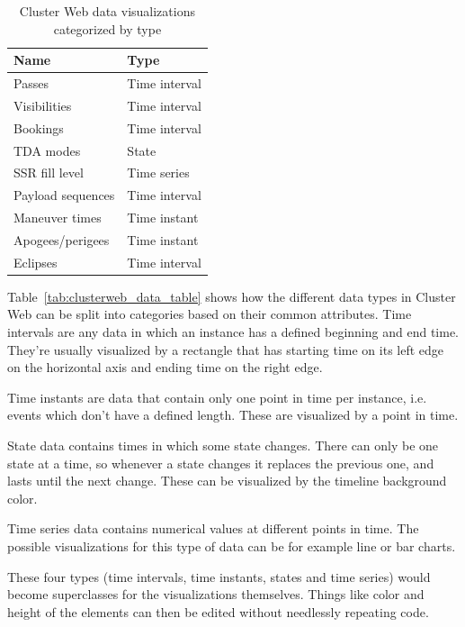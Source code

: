 \begin{table}[!ht]
\def\arraystretch{1.1}%
\begin{center}
  \caption{Cluster Web data visualizations categorized by type}
  \label{tab:clusterweb_data_types_table}
  \begin{tabular}{| l | l | }
    \hline
    Name & Type \\
    \hline
    Passes & Time interval \\
    Visibilities & Time interval \\
    Bookings & Time interval  \\
    TDA modes & State \\
    SSR fill level & Time series \\
    Payload sequences & Time interval \\
    Maneuver times & Time instant \\
    Apogees/perigees & Time instant \\
    Eclipses & Time interval \\
    \hline
  \end{tabular}

  \end{center}
\end{table}

Table~\ref{tab:clusterweb_data_table} shows how the different data types in Cluster Web can be split into categories based on their common attributes. Time intervals are any data in which an instance has a defined beginning and end time. They're usually visualized by a rectangle that has starting time on its left edge on the horizontal axis and ending time on the right edge.

Time instants are data that contain only one point in time per instance, i.e. events which don't have a defined length. These are visualized by a point in time.

State data contains times in which some state changes. There can only be one state at a time, so whenever a state changes it replaces the previous one, and lasts until the next change. These can be visualized by the timeline background color.

Time series data contains numerical values at different points in time. The possible visualizations for this type of data can be for example line or bar charts.

These four types (time intervals, time instants, states and time series) would become superclasses for the visualizations themselves. Things like color and height of the elements can then be edited without needlessly repeating  code.

